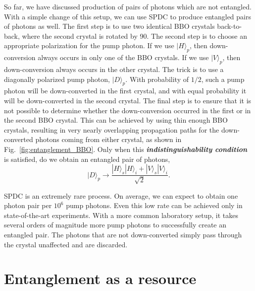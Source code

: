 So far, we have discussed production of pairs of photons which are not entangled.
With a simple change of this setup, we can use SPDC to produce entangled pairs of photons as well.
The first step is to use two identical BBO crystals back-to-back, where the second crystal is rotated by 90\degree.
The second step is to choose an appropriate polarization for the pump photon.
If we use $|H\rangle_p$, then down-conversion always occurs in only one of the BBO crystals.
If we use $|V\rangle_p$, then down-conversion always occurs in the other crystal.
The trick is to use a diagonally polarized pump photon, $|D\rangle_p$.
With probability of $1/2$, such a pump photon will be down-converted in the first crystal, and with equal probability it will be down-converted in the second crystal.
The final step is to ensure that it is not possible to determine whether the down-conversion occurred in the first or in the second BBO crystal.
This can be achieved by using thin enough BBO crystals, resulting in very nearly overlapping propagation paths for the down-converted photons coming from either crystal, as shown in Fig.~\ref{fig:entanglement_BBO}.
Only when this \textbf{\emph{indistinguishability condition}} is satisfied, do we obtain an entangled pair of photons,
\begin{equation}
    |D\rangle_p \rightarrow \frac{|H\rangle_s|H\rangle_i + |V\rangle_s|V\rangle_i}{\sqrt{2}}.
\end{equation}

SPDC is an extremely rare process.
On average, we can expect to obtain one photon pair per $10^6$ pump photons.
Even this low rate can be achieved only in state-of-the-art experiments.
With a more common laboratory setup, it takes several orders of magnitude more pump photons to successfully create an entangled pair.
The photons that are not down-converted simply pass through the crystal unaffected and are discarded.




\section{Entanglement as a resource}

